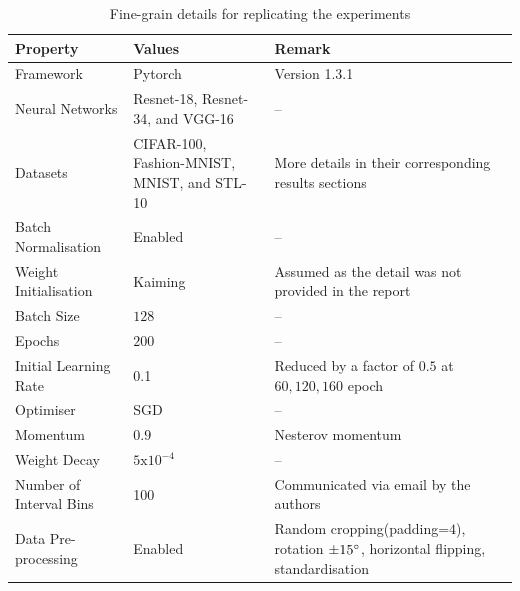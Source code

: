 \begin{table}[t]
\caption{Fine-grain details for replicating the experiments}\label{tab:details}
\begin{tabularx}{\textwidth}{XXX}
\toprule
Property & Values & Remark\\
\toprule
\rule{0pt}{1\normalbaselineskip}Framework & Pytorch & Version 1.3.1\\
\hline
\rule{0pt}{1\normalbaselineskip}Neural Networks & Resnet-18, Resnet-34, and VGG-16& --\\
\hline
\rule{0pt}{1\normalbaselineskip}Datasets & CIFAR-100, Fashion-MNIST, MNIST, and STL-10 & More details in their corresponding results sections\\
\hline
\rule{0pt}{1\normalbaselineskip}Batch Normalisation & Enabled & --\\
\hline
\rule{0pt}{1\normalbaselineskip}Weight Initialisation & Kaiming & Assumed as the detail was not provided in the report \\
\hline
\rule{0pt}{1\normalbaselineskip}Batch Size & $128$ & --\\
\hline
\rule{0pt}{1\normalbaselineskip}Epochs & $200$ & --\\
\hline
\rule{0pt}{1\normalbaselineskip}Initial Learning Rate & 0.1 & Reduced by a factor of $0.5$ at $60, 120, 160$ epoch\\
\hline
\rule{0pt}{1\normalbaselineskip}Optimiser & SGD & --\\
\hline
\rule{0pt}{1\normalbaselineskip}Momentum & $0.9$ & Nesterov momentum\\
\hline
\rule{0pt}{1\normalbaselineskip}Weight Decay & $5\text{x}10^{-4}$ & --\\
\hline
\rule{0pt}{1\normalbaselineskip}Number of Interval Bins & 100 & Communicated via email by the authors\\
\hline
\rule{0pt}{1\normalbaselineskip}Data Pre-processing & Enabled & Random cropping(padding=$4$), rotation $\SI{\pm 15}{}^\circ$, horizontal flipping, standardisation \\
\bottomrule
\end{tabularx}
\end{table}


